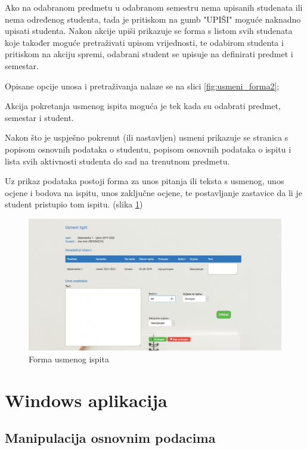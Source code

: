\documentclass[times, utf8, diplomski]{fer}
\begin{document}
Ako na odabranom predmetu u odabranom semestru nema upisanih studenata ili nema određenog studenta, tada je pritiskom na gumb "UPIŠI" moguće naknadno upisati studenta. Nakon akcije upiši prikazuje se forma s listom svih studenata koje također moguće pretraživati upisom vrijednosti, te odabirom studenta i pritiskom na akciju spremi, odabrani student se upisuje na definirati predmet i semestar.

Opisane opcije unosa i pretraživanja nalaze se na slici \ref{fig:usmeni_forma2};

Akcija pokretanja usmenog ispita moguća je tek kada su odabrati predmet, semestar i student.

Nakon što je uspješno pokrenut (ili nastavljen) usmeni prikazuje se stranica s popisom osnovnih podataka o studentu, popisom osnovnih podataka o ispitu i lista svih aktivnosti studenta do sad na trenutnom predmetu.

Uz prikaz podataka postoji forma za unos pitanja ili teksta s usmenog, unos ocjene i bodova na ispitu, unos zaključne ocjene, te postavljanje zastavice da li je student pristupio tom ispitu. (slika \ref{fig:usmeni_usmeni})

\begin{figure}[htb]
\centering
\includegraphics[width=14cm]{usmeni_usmeni_examsbefore.jpg}
\caption{Forma usmenog ispita}
\label{fig:usmeni_usmeni}
\end{figure}

\section{Windows aplikacija}
\subsection{Manipulacija osnovnim podacima}
\end{document}
